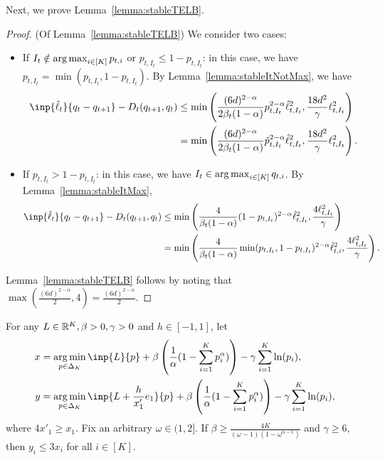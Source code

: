 Next, we prove Lemma~\ref{lemma:stableTELB}.
\begin{proof}(Of Lemma~\ref{lemma:stableTELB})
    We consider two cases: 
    \begin{itemize}
        \item If $I_t \notin \operatorname*{arg\,max}_{i \in [K]}p_{t,i}$ or $p_{t,I_t} \leq 1 - p_{t,I_t}$: in this case, we have $p_{t,I_t} = \min(p_{t,I_t}, 1 - p_{t,I_t})$. By Lemma~\ref{lemma:stableItNotMax}, we have
        \begin{align*}
            \inp{\hat{\ell}_t}{q_{t}  - q_{t+1}} - D_t(q_{t+1}, q_t) &\leq  \min\left( \frac{(6d)^{2-\alpha}}{2\beta_t(1-\alpha)}p_{t,I_t}^{2-\alpha}\hat{\ell}^2_{t,I_t}, \frac{18d^2}{\gamma} \ell_{t,I_t}^2  \right) \\
            &= \min\left( \frac{(6d)^{2-\alpha}}{2\beta_t(1-\alpha)}\tilde{p}_{t,I_t}^{2-\alpha}\hat{\ell}^2_{t,I_t}, \frac{18d^2}{\gamma} \ell_{t,I_t}^2  \right).
        \end{align*}
        
        \item If $p_{t,I_t} > 1 - p_{t,I_t}$: in this case, we have $I_t \in \operatorname*{arg\,max}_{i \in [K]}q_{t,i}$. By Lemma~\ref{lemma:stableItMax}, 
        \begin{align*}
            \inp{\hat{\ell}_t}{q_{t}  - q_{t+1}} - D_t(q_{t+1}, q_t) &\leq \min\left(\frac{4}{\beta_t(1-\alpha)} (1-p_{t,I_t})^{2-\alpha}\hat{\ell}_{t,I_t}^2, \frac{4\ell_{t,I_t}^2}{\gamma}  \right) \\
            &= \min\left(\frac{4}{\beta_t(1-\alpha)}\min(p_{t,I_t}, 1 - p_{t,I_t})^{2-\alpha}\hat{\ell}_{t,i}^2, \frac{4\ell_{t,I_t}^2}{\gamma}  \right).
        \end{align*}
    \end{itemize}
    Lemma~\ref{lemma:stableTELB} follows by noting that $\max\left(\frac{(6d)^{2-\alpha}}{2}, 4\right) = \frac{(6d)^{2-\alpha}}{2}$.
\end{proof}
\begin{lemma}
    For any $L \in \mathbb{R}^K, \beta > 0, \gamma > 0$ and $h \in [-1, 1]$, let 
    \begin{align*}
        x &= \argmin_{p \in \Delta_K}\inp{L}{p} + \beta\left(\frac{1}{\alpha}(1-\sum_{i=1}^K p_i^\alpha)\right) - \gamma\sum_{i=1}^K \ln(p_i), \\
        y &= \argmin_{p \in \Delta_K}\inp{L + \frac{h}{x'_1}e_1}{p} + \beta\left(\frac{1}{\alpha}(1-\sum_{i=1}^K p_i^\alpha)\right) - \gamma\sum_{i=1}^K \ln(p_i),
    \end{align*}
    where $4x'_1 \geq x_1$. Fix an arbitrary $\omega \in (1, 2]$. If $\beta \geq \frac{4K}{(\omega-1)(1-\omega^{\alpha-1})}$ and $\gamma \geq 6$, then $y_i \leq 3x_i$ for all $i \in [K]$.
    \label{lemma:stableBigBeta}
\end{lemma}
